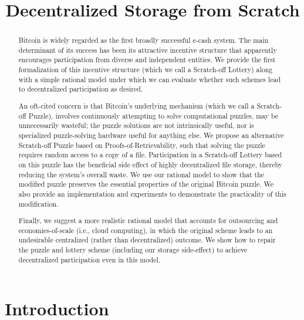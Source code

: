 \documentclass[]{article}
\theoremstyle{remark}
\begin{document}
\title{Decentralized Storage from Scratch}

\maketitle

\begin{abstract}
  Bitcoin is widely regarded as the first broadly successful e-cash system. The main determinant of its success has been its attractive incentive structure that apparently encourages participation from diverse and independent entities. We provide the first formalization of this incentive structure (which we call a Scratch-off Lottery) along with a simple rational model under which we can evaluate whether such schemes lead to decentralized participation as desired.

An oft-cited concern is that Bitcoin's underlying mechanism (which we call a Scratch-off Puzzle), involves continuously attempting to solve computational puzzles, may be unnecessarily wasteful; the puzzle solutions are not intrinsically useful, nor is specialized puzzle-solving hardware useful for anything else. We propose an alternative Scratch-off Puzzle based on Proofs-of-Retrievability, such that solving the puzzle requires random access to a copy of a file. Participation in a Scratch-off Lottery based on this puzzle has the beneficial side effect of highly decentralized file storage, thereby reducing the system's overall waste. We use our rational model to show that the modified puzzle preserves the essential properties of the original Bitcoin puzzle. We also provide an implementation and experiments to demonstrate the practicality of this modification.

Finally, we suggest a more realistic rational model that accounts for outsourcing and economies-of-scale (i.e., cloud computing), in which the original scheme leads to an undesirable centralized (rather than decentralized) outcome. We show how to repair the puzzle and lottery scheme (including our storage side-effect) to achieve decentralized participation even in this model.

\end{abstract}

\section{Introduction}





\end{document}
